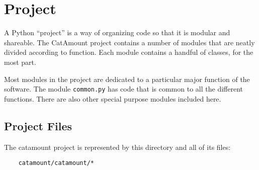 \chapter{Project}
\hypertarget{project}{}

A Python ``project'' is a way of organizing code so that it is
modular and shareable. The CatAmount project contains a number
of modules that are neatly divided according to function. Each
module contains a handful of classes, for the most part.

Most modules in the project are dedicated to a particular major
function of the software. The module \texttt{common.py} has code that is
common to all the different functions. There are also other special
purpose modules included here.

\section{Project Files}

The catamount project is represented by this directory and all
of its files:

\begin{verbatim}
    catamount/catamount/*
\end{verbatim}

